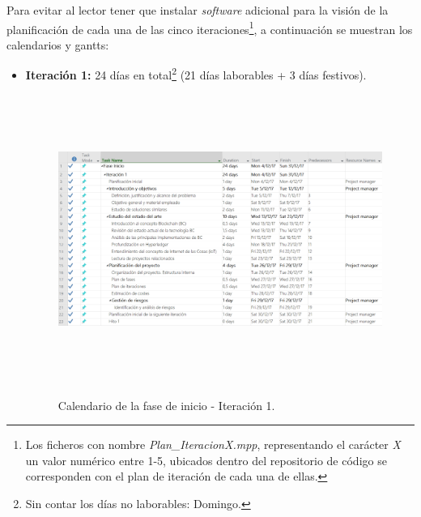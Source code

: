 \documentclass[12pt,a4paper, twoside]{report}
\begin{document}
	Para evitar al lector tener que instalar \textit{software} adicional para la visión de la planificación de cada una de las cinco iteraciones\footnote{Los ficheros con nombre \textit{Plan\_IteracionX.mpp}, representando el carácter \textit{X} un valor numérico entre 1-5, ubicados dentro del repositorio de código se corresponden con el plan de iteración de cada una de ellas.}, a continuación se muestran los calendarios y \glspl{gantt}: 
	
	\begin{itemize}

		\item \textbf{Iteración 1:} 24 días en total\footnote{Sin contar los días no laborables: Domingo.} (21 días laborables + 3 días festivos). %
		
		\begin{figure}[!ht]   
			\caption{Calendario de la fase de inicio - Iteración 1.} 
			\begin{center} 
		 		\includegraphics[width=16cm,height=9.4cm]{Images/planning/iterations/It1_calendar} \\
				\label{fig:planning-it1-calendar} 
			\end{center}  
		\end{figure}  
		

\end{itemize}
\end{document}
